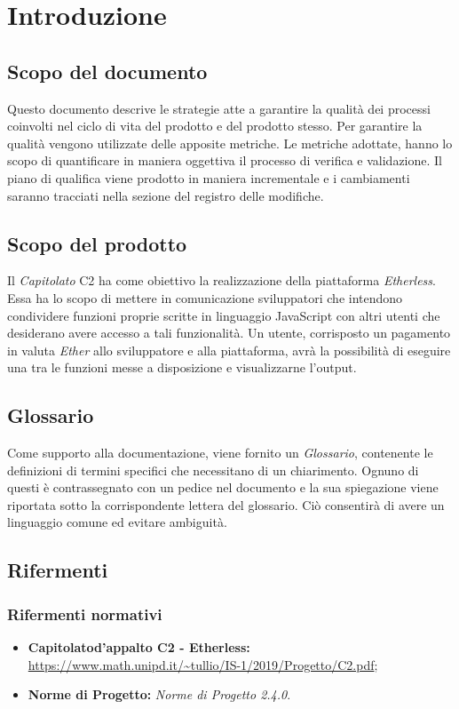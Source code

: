\setlength\LTleft{0cm}
\section{Introduzione}

\subsection{Scopo del documento}
Questo documento descrive le strategie atte a garantire la qualità dei processi coinvolti nel ciclo di vita del prodotto e del prodotto stesso. Per garantire la qualità vengono utilizzate delle apposite metriche. Le metriche adottate, hanno lo scopo di quantificare in maniera oggettiva il processo di verifica e validazione. Il piano di qualifica viene prodotto in maniera incrementale e i cambiamenti saranno tracciati nella sezione del registro delle modifiche.


\subsection{Scopo del prodotto}
Il \textit{Capitolato\glo} C2 ha come obiettivo la realizzazione della piattaforma \textit{Etherless}. Essa ha lo scopo di mettere in comunicazione sviluppatori che intendono condividere funzioni proprie scritte in linguaggio JavaScript con altri utenti che desiderano avere accesso a tali funzionalità. Un utente, corrisposto un pagamento in valuta \textit{Ether\glo} allo sviluppatore e alla piattaforma, avrà la possibilità di eseguire una tra le funzioni messe a disposizione e visualizzarne l'output.

\subsection{Glossario}
Come supporto alla documentazione, viene fornito un \textit{Glossario}\docs,
contenente le definizioni di termini specifici che necessitano di un chiarimento.
Ognuno di questi è contrassegnato con un pedice \glo nel documento e la sua
spiegazione viene riportata sotto la corrispondente lettera del glossario. Ciò
consentir\`a di avere un linguaggio comune ed evitare ambiguità.

\subsection{Rifermenti}
\subsubsection{Rifermenti normativi}
\begin{itemize}
\item \textbf{Capitolato\glo d'appalto C2 - Etherless:} \url{https://www.math.unipd.it/~tullio/IS-1/2019/Progetto/C2.pdf};
\item \textbf{Norme di Progetto:} \textit{Norme di Progetto 2.4.0\docs}.
\end{itemize}
